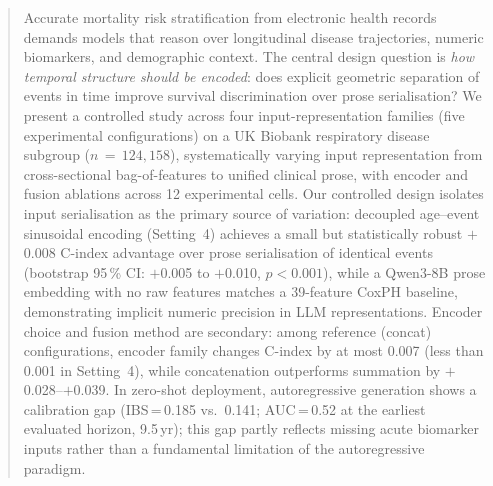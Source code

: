 \begin{abstract}
Accurate mortality risk stratification from electronic health records demands
models that reason over longitudinal disease trajectories, numeric biomarkers,
and demographic context.
The central design question is \emph{how temporal structure should be encoded}:
does explicit geometric separation of events in time improve survival
discrimination over prose serialisation?
We present a controlled study across four input-representation families
(five experimental configurations) on a UK Biobank respiratory disease
subgroup ($n\,{=}\,124{,}158$), systematically varying input representation
from cross-sectional bag-of-features to unified clinical prose, with encoder
and fusion ablations across 12 experimental cells.
Our controlled design isolates input serialisation as the primary source of
variation: decoupled age--event sinusoidal encoding (Setting~4) achieves a
small but statistically robust $+$0.008 C-index advantage over prose
serialisation of identical events (bootstrap 95\,\% CI: $+$0.005 to
$+$0.010, $p<0.001$), while a Qwen3-8B prose embedding with no raw features
matches a 39-feature CoxPH baseline, demonstrating implicit numeric
precision in LLM representations.
Encoder choice and fusion method are secondary: among reference (concat)
configurations, encoder family changes C-index by at most 0.007 (less than
0.001 in Setting~4), while concatenation outperforms summation by
$+$0.028--$+$0.039.
In zero-shot deployment, autoregressive generation shows a calibration gap
(IBS\,=\,0.185 vs.\ 0.141; AUC\,=\,0.52 at the earliest evaluated horizon,
9.5\,yr); this gap partly reflects missing acute biomarker inputs rather than
a fundamental limitation of the autoregressive paradigm.
\end{abstract}
